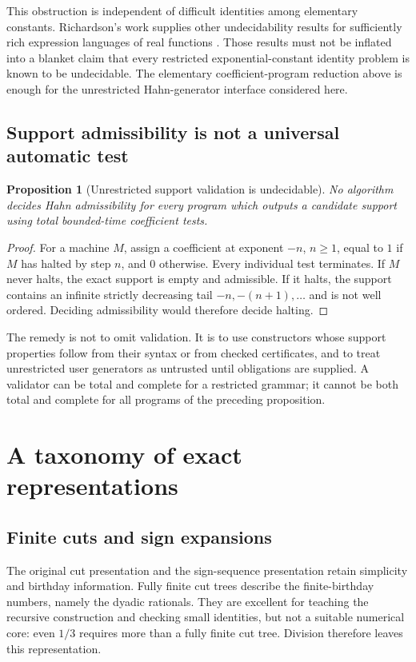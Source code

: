 \documentclass[11pt,letterpaper]{article}
\numberwithin{equation}{section}
\newtheorem{proposition}[theorem]{Proposition}
\theoremstyle{definition}
\theoremstyle{remark}\newtheorem{remark}[theorem]{Remark}
\begin{document}
This obstruction is independent of difficult identities among elementary
constants. Richardson's work supplies other undecidability results for
sufficiently rich expression languages of real functions
\cite{Richardson}. Those results must not be inflated into a blanket claim
that every restricted exponential-constant identity problem is known to be
undecidable. The elementary coefficient-program reduction above is enough
for the unrestricted Hahn-generator interface considered here.

\subsection{Support admissibility is not a universal automatic test}
\begin{proposition}[Unrestricted support validation is undecidable]
\label{prop:validation}
No algorithm decides Hahn admissibility for every program which outputs a
candidate support using total bounded-time coefficient tests.
\end{proposition}
\begin{proof}
For a machine $M$, assign a coefficient at exponent $-n$, $n\ge1$, equal to
$1$ if $M$ has halted by step $n$, and $0$ otherwise. Every individual test
terminates. If $M$ never halts, the exact support is empty and admissible.
If it halts, the support contains an infinite strictly decreasing tail
$-n,-(n+1),\ldots$ and is not well ordered. Deciding admissibility would
therefore decide halting.
\end{proof}
The remedy is not to omit validation. It is to use constructors whose support
properties follow from their syntax or from checked certificates, and to treat
unrestricted user generators as untrusted until obligations are supplied.
A validator can be total and complete for a restricted grammar; it cannot be
both total and complete for all programs of the preceding proposition.

\section{A taxonomy of exact representations}
\label{sec:representations}

\subsection{Finite cuts and sign expansions}
The original cut presentation and the sign-sequence presentation retain
simplicity and birthday information. Fully finite cut trees describe the
finite-birthday numbers, namely the dyadic rationals. They are excellent
for teaching the recursive construction and checking small identities, but
not a suitable numerical core: even $1/3$ requires more than a fully finite
cut tree. Division therefore leaves this representation.
\end{document}
